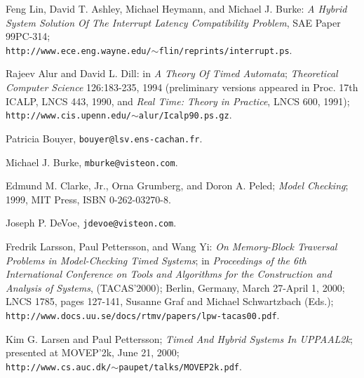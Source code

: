 %

\label{cbib0}


\begin{thebibliography}{99}
 Feng Lin,
   David T. Ashley, Michael Heymann, and Michael
   J. Burke:  \emph{A Hybrid System Solution Of The
   Interrupt Latency Compatibility Problem}, SAE
   Paper 99PC-314; \\
   \texttt{http://www.ece.eng.wayne.edu/$\sim$flin/reprints/interrupt.ps}.

 Rajeev Alur and 
   David L. Dill:  in \emph{A Theory Of Timed Automata}; 
   \emph{Theoretical Computer Science} 126:183-235, 1994 
   (preliminary versions appeared in Proc. 17th ICALP, LNCS 443, 1990, 
   and \emph{Real Time: Theory in Practice}, LNCS 600, 1991);\\
   \texttt{http://www.cis.upenn.edu/$\sim$alur/Icalp90.ps.gz}.

Patricia Bouyer, 
   \texttt{bouyer@lsv.ens-cachan.fr}.

 Michael J. Burke, 
   \texttt{mburke@visteon.com}.

 Edmund M. Clarke, Jr.,
   Orna Grumberg, and Doron A. Peled; \emph{Model Checking};
   1999, MIT Press, ISBN 0-262-03270-8.

 Joseph P. DeVoe, 
   \texttt{jdevoe@visteon.com}.

 Fredrik Larsson, Paul
   Pettersson, and Wang Yi:  \emph{On Memory-Block Traversal Problems 
   in Model-Checking Timed Systems}; 
   in \emph{Proceedings of the 6th International Conference on Tools and Algorithms 
   for the Construction and Analysis of Systems}, (TACAS'2000); Berlin, Germany, 
   March 27-April 1, 2000; LNCS 1785, pages 127-141, Susanne Graf and Michael Schwartzbach 
   (Eds.);\\
   \texttt{http://www.docs.uu.se/docs/rtmv/papers/lpw-tacas00.pdf}.

 Kim G. Larsen and Paul Pettersson;
   \emph{Timed And Hybrid Systems In UPPAAL2k};
   presented at MOVEP'2k, June 21, 2000; \\
   \texttt{http://www.cs.auc.dk/$\sim$paupet/talks/MOVEP2k.pdf}.
\end{thebibliography}

